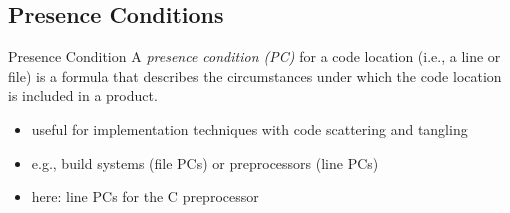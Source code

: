 \subsection{Presence Conditions}

\begin{frame}[fragile]{\myframetitle}
	\vspace*{-4ex}
	\begin{mycolumns}[t,columns=3,widths={40,23,37},animation=none]
		\begin{definition}{Presence Condition}
			A \emph{presence condition (PC)} for a code location (i.e., a line or file) is a formula that describes the circumstances under which the code location is included in a product.
		\end{definition}
		\begin{note}{}
			\begin{itemize}
				\item useful for implementation techniques with code scattering and tangling
				\item e.g., build systems (file PCs) or preprocessors (line PCs)
				\item here: line PCs for the C preprocessor
			\end{itemize}
		\end{note}
	\mynextcolumn
\end{mycolumns}
\end{frame}
